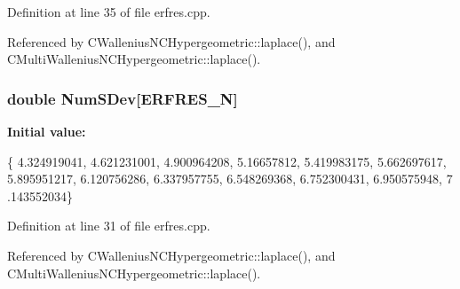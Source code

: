 Definition at line 35 of file erfres.\-cpp.



Referenced by C\-Wallenius\-N\-C\-Hypergeometric\-::laplace(), and C\-Multi\-Wallenius\-N\-C\-Hypergeometric\-::laplace().

\subsubsection[{Num\-S\-Dev}]{\setlength{\rightskip}{0pt plus 5cm}double Num\-S\-Dev[{\bf E\-R\-F\-R\-E\-S\-\_\-\-N}]}\label{rnd_2erfres_8cpp_a29461f93b72e58f78d8347360167bb79}
{\bfseries Initial value\-:}
\begin{DoxyCode}
 \{
   4.324919041, 4.621231001, 4.900964208, 5.16657812, 5.419983175, 5.662697617,
       5.895951217, 6.120756286, 6.337957755, 6.548269368, 6.752300431, 6.950575948, 7
      .143552034\}
\end{DoxyCode}


Definition at line 31 of file erfres.\-cpp.



Referenced by C\-Wallenius\-N\-C\-Hypergeometric\-::laplace(), and C\-Multi\-Wallenius\-N\-C\-Hypergeometric\-::laplace().

